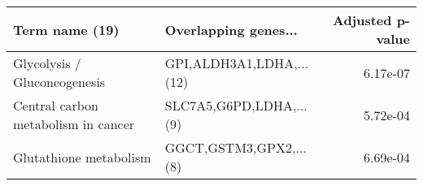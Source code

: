 \begin{tabular}{llr}
\toprule
                     Term name (19) &     Overlapping genes... &  Adjusted p-value \\
\midrule
       Glycolysis / Gluconeogenesis & GPI,ALDH3A1,LDHA,...(12) &          6.17e-07 \\
Central carbon metabolism in cancer &  SLC7A5,G6PD,LDHA,...(9) &          5.72e-04 \\
             Glutathione metabolism &   GGCT,GSTM3,GPX2,...(8) &          6.69e-04 \\
\bottomrule
\end{tabular}
